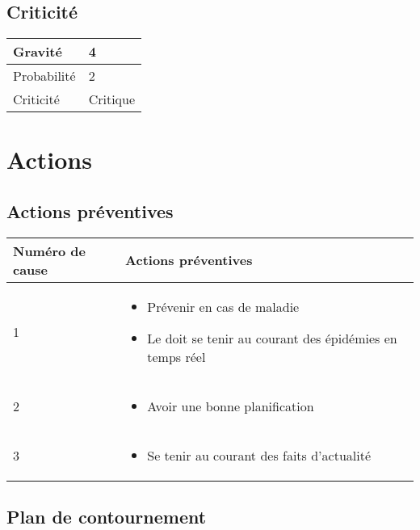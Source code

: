 \subsection*{Criticité}

\begin{table}[h]
\centering
	\begin{tabularx}{12.8cm}{|>{}X|X|}
	\hline
	Gravité & 4\\
	\hline
	Probabilité & 2\\
	\hline
	Criticité & Critique\\
	\hline
	\end{tabularx}
\end{table}
\newpage

\section*{Actions}
\subsection*{Actions préventives}

\centering
	\begin{longtable}{|p{7cm}|p{7cm}|}
	\hline
	\rowcolor{gray!40} Numéro de cause & Actions préventives \\
	\hline
	 1 & \begin{itemize}
	 	\item Prévenir en cas de maladie
	 	\item Le \CP{} doit se tenir au courant des épidémies en temps réel
	 \end{itemize} \\

	\hline
	2 & \begin{itemize}
		\item Avoir une bonne planification
	\end{itemize} \\
	\hline
	3 & \begin{itemize}
		\item Se tenir au courant des faits d'actualité
	\end{itemize} \\
	\hline
	\end{longtable}

\flushleft
\subsection*{Plan de contournement}


